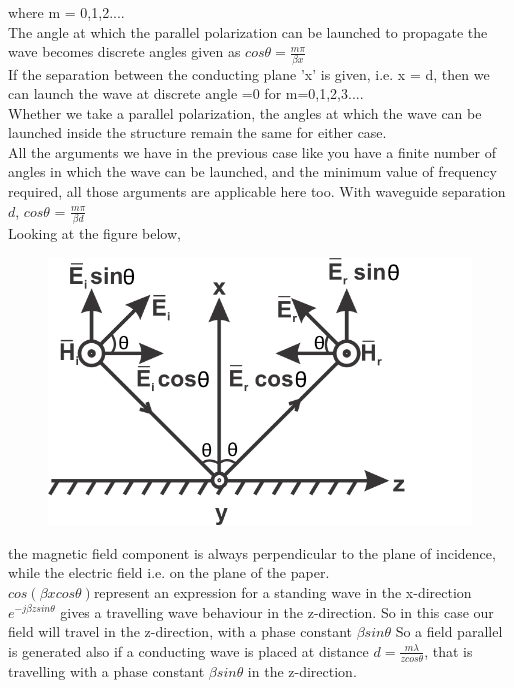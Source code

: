 where m = 0,1,2....\\
The angle at which the parallel polarization can be launched to propagate the wave becomes discrete angles given as $cos\theta = \frac{m\pi}{\beta x}$\\
If the separation between the conducting plane 'x' is given, i.e. x = d, then we can launch the wave at discrete angle =0 for m=0,1,2,3....\\
Whether we take a parallel polarization, the angles at which the wave can be launched inside the structure remain the same for either case. \\
All the arguments we have in the previous case like you have a finite number of angles in which the wave can be launched, and the minimum value of frequency required, all those arguments are applicable here too. With waveguide separation $d$, $cos\theta$ = $\frac{m\pi}{\beta d}$\\
Looking at the figure below,\\
\begin{figure}[h]
\centering
\includegraphics[scale=1]{./graphics/silas2}
\caption{}
\end{figure}
the magnetic field component is always perpendicular to the plane of incidence, while the electric field i.e. on the plane of the paper.\\
$cos(\beta xcos\theta)$represent an expression for a standing wave in the x-direction 
$e^{-j\beta zsin\theta}$ gives a travelling wave behaviour in the z-direction. So in this case our field will travel in the z-direction, with a phase constant $\beta sin\theta$ 
So a field parallel is generated also if a conducting wave is placed at distance $d= \frac{m\lambda}{z cos\theta}$, that is travelling with a phase constant $\beta sin\theta$ in the z-direction.\\ 

